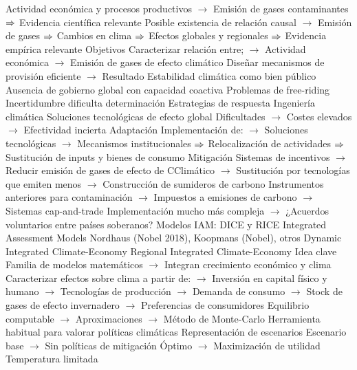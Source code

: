 \documentclass{nuevotema}
\begin{document}
\begin{esquemal}
				\4[] Actividad económica y procesos productivos
				\4[] $\to$ Emisión de gases contaminantes
				\4[] $\Rightarrow$ Evidencia científica relevante
				\4[] Posible existencia de relación causal
				\4[] $\to$ Emisión de gases
				\4[] $\Rightarrow$ Cambios en clima
				\4[] $\Rightarrow$ Efectos globales y regionales
				\4[] $\Rightarrow$ Evidencia empírica relevante
				\4 Objetivos
				\4[] Caracterizar relación entre;
				\4[] $\to$ Actividad económica
				\4[] $\to$ Emisión de gases de efecto climático
				\4[] Diseñar mecanismos de provisión eficiente
				\4[] $\to$
				\4 Resultado
				\4[] Estabilidad climática como bien público
				\4[] Ausencia de gobierno global con capacidad coactiva
				\4[] Problemas de free-riding
				\4[] Incertidumbre dificulta determinación
			\3 Estrategias de respuesta
				\4 Ingeniería climática
				\4[] Soluciones tecnológicas de efecto global
				\4[] Dificultades
				\4[] $\to$ Costes elevados
				\4[] $\to$ Efectividad incierta
				\4 Adaptación
				\4[] Implementación de:
				\4[] $\to$ Soluciones tecnológicas
				\4[] $\to$ Mecanismos institucionales
				\4[] $\Rightarrow$ Relocalización de actividades
				\4[] $\Rightarrow$ Sustitución de inputs y bienes de consumo
				\4 Mitigación
				\4[] Sistemas de incentivos
				\4[] $\to$ Reducir emisión de gases de efecto de CClimático
				\4[] $\to$ Sustitución por tecnologías que emiten menos
				\4[] $\to$ Construcción de sumideros de carbono
				\4[] Instrumentos anteriores para contaminación
				\4[] $\to$ Impuestos a emisiones de carbono
				\4[] $\to$ Sistemas cap-and-trade
				\4[] Implementación mucho más compleja
				\4[] $\to$ ¿Acuerdos voluntarios entre países soberanos?
			\3 Modelos IAM: DICE y RICE
				\4 Integrated Assessment Models
				\4 Nordhaus (Nobel 2018), Koopmans (Nobel), otros
				\4 Dynamic Integrated Climate-Economy
				\4 Regional Integrated Climate-Economy
				\4 Idea clave
				\4[] Familia de modelos matemáticos
				\4[] $\to$ Integran crecimiento económico y clima
				\4[] Caracterizar efectos sobre clima a partir de:
				\4[] $\to$ Inversión en capital físico y humano
				\4[] $\to$ Tecnologías de producción
				\4[] $\to$ Demanda de consumo
				\4[] $\to$ Stock de gases de efecto invernadero
				\4[] $\to$ Preferencias de consumidores
				\4[] Equilibrio computable
				\4[] $\to$ Aproximaciones
				\4[] $\to$ Método de Monte-Carlo
				\4[] Herramienta habitual para valorar políticas climáticas
				\4 Representación de escenarios
				\4[] Escenario base
				\4[] $\to$ Sin políticas de mitigación
				\4[] Óptimo
				\4[] $\to$ Maximización de utilidad
				\4[] Temperatura limitada

\end{esquemal}
\end{document}

